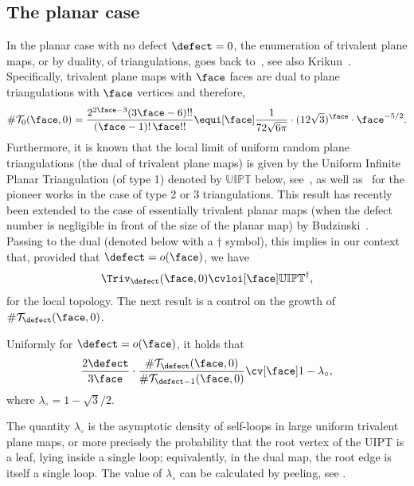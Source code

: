 \subsection{The planar case}
\label{ssec:defaut_planar}

In the planar case with no defect $\defect=0$, the enumeration of trivalent plane maps, or by duality, of triangulations, goes back to~\cite{MNS70}, see also Krikun~\cite{Kri07}.
Specifically, trivalent plane maps with $\face$ faces are dual to plane triangulations with $\face$ vertices and therefore,
\begin{equation}\label{eq:triangulations}
\#\mathcal{T}_0(\face,0)
= \frac{2^{2\face-3} (3\face-6)!!}{(\face-1)! \, \face!!}
\equi[\face] \frac{1}{72 \sqrt{6\pi}} \cdot (12\sqrt{3})^\face \cdot \face^{-5/2}.
\end{equation}
Furthermore, it is known that the local limit of uniform random plane triangulations (the dual of trivalent plane maps) is given by the Uniform Infinite Planar Triangulation (of type 1) denoted by $\mathbb{UIPT}$ below, see~\cite[Th.\,6.1]{Ste18}, as well as~\cite{AS03} for the pioneer works in the case of type 2 or 3 triangulations. This result has recently been extended to the case of essentially trivalent planar maps (\ie when the defect number is negligible in front of the size of the planar map) by Budzinski~\cite[Cor.\,2]{Bud21}. Passing to the dual (denoted below with a $\dagger$ symbol), this implies in our context that, provided that $ \defect = o(\face)$, we have
\begin{equation} \label{eq:convUIPT}
\Triv_{ \defect}(\face, 0) \cvloi[\face] \mathbb{UIPT}^\dagger,
\end{equation}
for the local topology.
The next result is a control on the growth of $\#\mathcal{T}_ \defect(\face,0)$.

\begin{lemma}
\label{lem:ratio_defauts}
Uniformly for $\defect = o(\face)$, it holds that
\[
\frac{2 \defect}{3 \face} \cdot \frac{\#\mathcal{T}_{\defect}(\face, 0)}{\#\mathcal{T}_{\defect-1}(\face,0)} \cv[\face] 1-\lambda_{\circ},
\]
where $\lambda_{\circ} = 1 - \sqrt{3}/2$.\end{lemma}

The quantity $\lambda_{\circ}$ is the asymptotic density of self-loops in large uniform trivalent plane maps, or more precisely the probability that the root vertex of the UIPT is a leaf, lying inside a single loop; equivalently, in the dual map, the root edge is itself a single loop. The value of $\lambda_{\circ}$ can be calculated by peeling, see \eg \cite[\S 2]{CLG19}.

